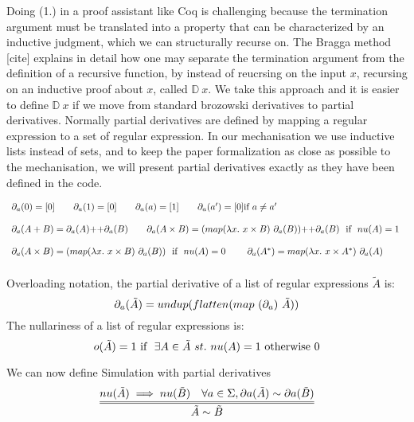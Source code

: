 \documentclass[a4paper,UKenglish,cleveref, autoref, thm-restate]{lipics-v2021}
\begin{document}
Doing (1.) in a proof assistant like Coq is challenging because the termination argument must be translated into a property that can be characterized by an inductive judgment, which we can structurally recurse on. The Bragga method [cite] explains in detail how one may separate the termination argument from the definition of a recursive function, by instead of reucrsing on the input $x$, recursing on an inductive proof about $x$, called $\mathbb{D}~x$. We take this approach and it is easier to define $\mathbb{D}~x$ if we move from standard brozowski derivatives to partial derivatives. Normally partial derivatives are defined by mapping a regular expression to a set of regular expression. In our mechanisation we use inductive lists instead of sets, and to keep the paper formalization as close as possible to the mechanisation, we will present partial derivatives exactly as they have been defined in the code.\\
\begin{definition}
  \begin{displaymath}
    \begin{array}{lll}
\pd{a}{0} = [0] \qquad \pd{a}{1} = [0] \qquad \pd{a}{a} = [1] \qquad \pd{a}{a'} = [0]\text{if}~a \neq a'\\\\
\pd{a}{A + B} = \cat{\pd{a}{A}}{\pd{a}{B}} \qquad \pd{a}{A \times B} = \cat{(\mathsf{map }(\lambda x.~x \times B)~\pd{a}{B})}{\pd{a}{B}} ~\text{ if }~\mynu{A} = 1~\\\\
\pd{a}{A \times B} = (\mathsf{map }(\lambda x.~x \times B)~\pd{a}{B}) ~\text{ if }~\mynu{A} = 0~ 
\qquad \pd{a}{A^*} = \mathsf{map }(\lambda x.~x \times A^*)~\pd{a}{A}  \\\\
    \end{array}
  \end{displaymath}
Overloading notation, the partial derivative of a list of regular expressions $\tilde{A}$ is:
\[\pd{a}{\tilde{A}} = \mathsf{undup}(\mathsf{flatten}(\mymap{\partial_a}{\tilde{A}}))\]
The nullariness of a list of regular expressions is:
\[\myo{\tilde{A}} = 1 ~\text{if }~\exists A \in \tilde{A}~st. ~ \mynu{A}=1 \text{ otherwise } 0\]
\end{definition}
We can now define Simulation with partial derivatives
\[\infer={\tilde{A} \sim \tilde{B}}{\mynu{\tilde{A}} \implies \mynu{\tilde{B}} & \forall a \in \Sigma, \mypar{a}{\tilde{A}} \sim \mypar{a}{\tilde{B}} }\]
\end{document}
